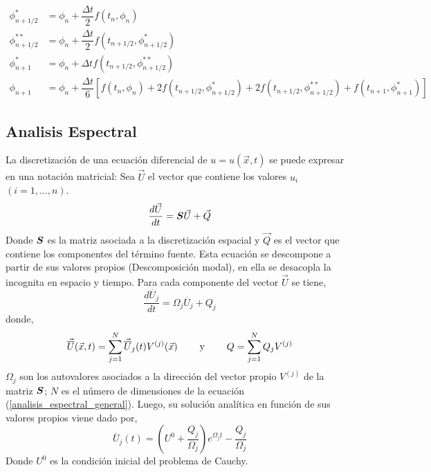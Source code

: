 \begin{align}
\phi^*_{n+1/2} &= \phi_n + \dfrac{\Delta t}{2} f(t_n,\phi_n)\\
\phi^{**}_{n+1/2} &= \phi_n + \dfrac{\Delta t}{2} f(t_{n+1/2},\phi^*_{n+1/2})\\
\phi^*_{n+1} &= \phi_n + \Delta t f(t_{n+1/2},\phi^{**}_{n+1/2})\\
\phi_{n+1} &= \phi_n + \dfrac{\Delta t}{6} \left[ f(t_n,\phi_n) + 2 f(t_{n+1/2},\phi^*_{n+1/2}) + 2 f(t_{n+1/2},\phi^{**}_{n+1/2}) + f(t_{n+1},\phi^*_{n+1}) \right] 
\end{align}

\subsection{Analisis Espectral}
La discretización de una ecuación diferencial de $u=u(\vec{x},t)$ se puede expresar en una notación matricial: Sea $\vec{U}$ el vector que contiene los valores $u_i$ $ (i=1, \ldots ,n)$.
\begin{equation} \label{analisis_espectral_general}
\dfrac{d \vec{U}}{d t} = \boldsymbol{S} \vec{U} + \vec{Q}
\end{equation}
Donde $\boldsymbol{S}$ es la matriz asociada a la discretización espacial y $\vec{Q}$ es el vector que contiene los componentes del término fuente. Esta ecuación se descompone a partir de sus valores propios (Descomposición modal), en ella se desacopla la incognita en espacio y tiempo. Para cada componente del vector $\vec{U}$ se tiene,
\begin{equation} \label{analisis_espectral_descompuesto}
\dfrac{d \overline{U}_j}{d t} = \Omega_j \overline{U}_j + Q_j
\end{equation}
donde,
\begin{equation}
\vec{\overline{U}}(\vec{x},t) = \sum_{j=1}^N \vec{\overline{U}}_j(t) V^{(j)}(\vec{x})
\hspace{0,8cm} \mbox{y} \hspace{0,8cm}
Q = \sum_{j=1}^N Q_j V^{(j)}
\end{equation}
$\Omega_j$ son los autovalores asociados a la dirección del vector propio $V^{(j)}$ de la matriz $\boldsymbol{S}$; $N$ es el número de dimensiones de la ecuación (\ref{analisis_espectral_general}). Luego, su solución analítica en función de sus valores propios viene dado por,
\begin{equation}
\overline{U}_j(t) = \left( U^0 + \dfrac{Q_j}{\Omega_j} \right) e^{\Omega_j t} - \dfrac{Q_j}{\Omega_j}
\end{equation}
Donde $U^0$ es la condición inicial del problema de Cauchy. 

